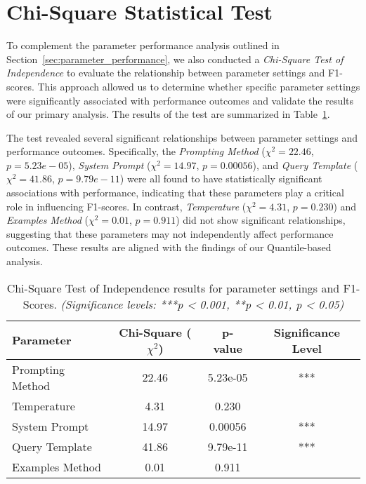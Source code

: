 \section{Chi-Square Statistical Test}\label{sec:appendix-b-statistical-test}

To complement the parameter performance analysis outlined in Section~\ref{sec:parameter_performance}, we also conducted a \emph{Chi-Square Test of Independence} to evaluate the relationship between parameter settings and F1-scores. This approach allowed us to determine whether specific parameter settings were significantly associated with performance outcomes and validate the results of our primary analysis. The results of the test are summarized in Table~\ref{tab:chi-square-results}.

The test revealed several significant relationships between parameter settings and performance outcomes. Specifically, the \emph{Prompting Method} ($\chi^2 = 22.46$, $p = 5.23e-05$), \emph{System Prompt} ($\chi^2 = 14.97$, $p = 0.00056$), and \emph{Query Template} ($\chi^2 = 41.86$, $p = 9.79e-11$) were all found to have statistically significant associations with performance, indicating that these parameters play a critical role in influencing F1-scores. In contrast, \emph{Temperature} ($\chi^2 = 4.31$, $p = 0.230$) and \emph{Examples Method} ($\chi^2 = 0.01$, $p = 0.911$) did not show significant relationships, suggesting that these parameters may not independently affect performance outcomes. These results are aligned with the findings of our Quantile-based analysis.

\begin{table}[t]
    \centering
    \scriptsize
    \begin{tabular}{lccc}
        \toprule
        \textbf{Parameter} & \textbf{Chi-Square ($\chi^2$)} & \textbf{p-value} & \textbf{Significance Level} \\
        \midrule
        Prompting Method   & 22.46  & 5.23e-05 & *** \\
        Temperature        & 4.31   & 0.230    &     \\
        System Prompt      & 14.97  & 0.00056  & *** \\
        Query Template     & 41.86  & 9.79e-11 & *** \\
        Examples Method    & 0.01   & 0.911    &     \\
        \bottomrule
    \end{tabular}
    \caption{Chi-Square Test of Independence results for parameter settings and F1-Scores. \emph{(Significance levels: ***p < 0.001, **p < 0.01, p < 0.05)}}\label{tab:chi-square-results}
\end{table}